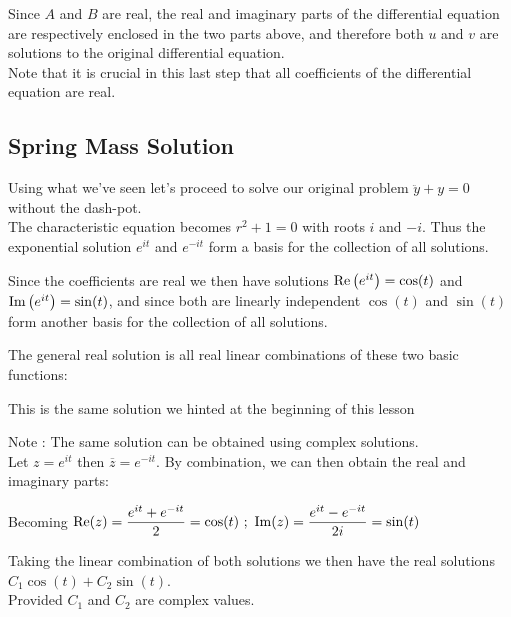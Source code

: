 \documentclass[11pt, openright]{book}
\begin{document}

Since $A$ and $B$ are real, the real and imaginary parts of the differential equation are respectively enclosed in the two parts above, and therefore both $u$ and $v$ are solutions to the original differential equation. \\
Note that it is crucial in this last step that all coefficients of the differential equation are real.

\subsection{Spring Mass Solution}

Using what we've seen let's proceed to solve our original problem $\ddot{y}+y=0$ without the dash-pot.\\
The characteristic equation becomes $r^2+1=0$ with roots $i$ and $-i$. Thus the exponential solution $e^{it}$ and $e^{-it}$ form a basis for the collection of all solutions.

Since the coefficients are real we then have solutions $\operatorname{Re}\left( e^{it} \right)=\cos(t)$ and $\operatorname{Im}\left( e^{it} \right)=\sin(t)$, and since both are linearly independent $\cos(t)$ and $\sin(t)$ form another basis for the collection of all solutions.

The general real solution is all real linear combinations of these two basic functions:

This is the same solution we hinted at the beginning of this lesson

\begin{dent}{Note :}
    The same solution can be obtained using complex solutions.\\
    Let $z=e^{it}$ then $\overline{z}=e^{-it}$. By combination, we can then obtain the real and imaginary parts:

    Becoming $\ds{\Re(z)=\frac{e^{it}+e^{-it}}{2}=\cos(t)\ ;\ \Im(z)=\frac{e^{it}-e^{-it}}{2i}=\sin(t)}$
\end{dent}

Taking the linear combination of both solutions we then have the real solutions $C_1\cos(t)+C_2\sin(t)$.\\
Provided $C_1$ and $C_2$ are complex values.
\end{document}
